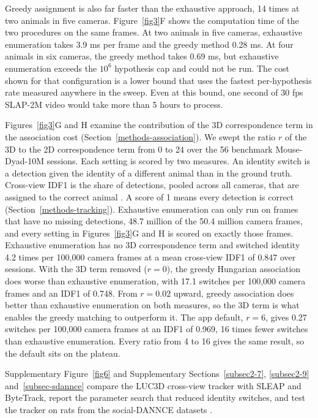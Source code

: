 \documentclass[pdflatex, sn-nature]{sn-jnl}
\theoremstyle{thmstyleone}%
\theoremstyle{thmstyletwo}%
\theoremstyle{thmstylethree}%
\begin{document}
Greedy assignment is also far faster than the exhaustive approach, 14 times at two animals in five cameras. Figure~\ref{fig3}F shows the computation time of the two procedures on the same frames. At two animals in five cameras, exhaustive enumeration takes 3.9 ms per frame and the greedy method 0.28 ms. At four animals in six cameras, the greedy method takes 0.69 ms, but exhaustive enumeration exceeds the $10^6$ hypothesis cap and could not be run. The cost shown for that configuration is a lower bound that uses the fastest per-hypothesis rate measured anywhere in the sweep. Even at this bound, one second of 30 fps SLAP-2M video would take more than 5 hours to process.

Figures~\ref{fig3}G and H examine the contribution of the 3D correspondence term in the association cost (Section~\ref{methods-association}). We swept the ratio $r$ of the 3D to the 2D correspondence term from 0 to 24 over the 56 benchmark Mouse-Dyad-10M sessions. Each setting is scored by two measures. An identity switch is a detection given the identity of a different animal than in the ground truth. Cross-view IDF1 is the share of detections, pooled across all cameras, that are assigned to the correct animal \citep{Ristani2016}. A score of 1 means every detection is correct (Section~\ref{methods-tracking}). Exhaustive enumeration can only run on frames that have no missing detections, 48.7 million of the 50.4 million camera frames, and every setting in Figures~\ref{fig3}G and H is scored on exactly those frames. Exhaustive enumeration has no 3D correspondence term and switched identity 4.2 times per 100,000 camera frames at a mean cross-view IDF1 of 0.847 over sessions. With the 3D term removed ($r = 0$), the greedy Hungarian association does worse than exhaustive enumeration, with 17.1 switches per 100,000 camera frames and an IDF1 of 0.748. From $r = 0.02$ upward, greedy association does better than exhaustive enumeration on both measures, so the 3D term is what enables the greedy matching to outperform it. The app default, $r = 6$, gives 0.27 switches per 100,000 camera frames at an IDF1 of 0.969, 16 times fewer switches than exhaustive enumeration. Every ratio from 4 to 16 gives the same result, so the default sits on the plateau.

Supplementary Figure~\ref{fig6} and Supplementary Sections~\ref{subsec2-7}, \ref{subsec2-9} and~\ref{subsec-sdannce} compare the LUC3D cross-view tracker with SLEAP and ByteTrack, report the parameter search that reduced identity switches, and test the tracker on rats from the social-DANNCE datasets \citep{Klibaite2025}.
\end{document}
